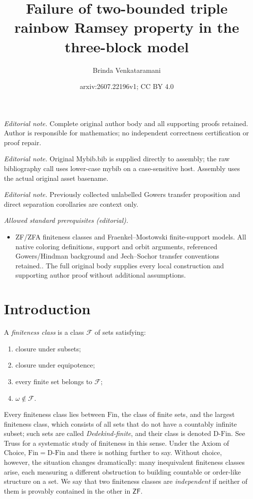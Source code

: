 \documentclass[10pt,a4paper]{amsart}
\title{Failure of two-bounded triple rainbow Ramsey property in the three-block model}
\author{Brinda Venkataramani}
\date{arxiv:2607.22196v1; CC BY 4.0}
\theoremstyle{definition}
\newcommand{\ZF}{\mathsf{ZF}}
\newcommand{\Fin}{\mathrm{Fin}}
\newcommand{\DFin}{\mathrm{D\text{-}Fin}}
\begin{document}
\maketitle
\noindent\textit{Editorial note.} Complete original author body and all supporting proofs retained. Author is responsible for mathematics; no independent correctness certification or proof repair.\par\medskip
\noindent\textit{Editorial note.} Original Mybib.bib is supplied directly to assembly; the raw bibliography call uses lower-case mybib on a case-sensitive host. Assembly uses the actual original asset basename.\par\medskip
\noindent\textit{Editorial note.} Previously collected unlabelled Gowers transfer proposition and direct separation corollaries are context only.\par\medskip
\noindent\textit{Allowed standard prerequisites (editorial).}\begin{itemize}
\item ZF/ZFA finiteness classes and Fraenkel--Mostowski finite-support models. All native coloring definitions, support and orbit arguments, referenced Gowers/Hindman background and Jech--Sochor transfer conventions retained.. The full original body supplies every local construction and supporting author proof without additional assumptions.
\end{itemize}\medskip
\section{Introduction}

A \emph{finiteness class} is a class \(\mathcal F\) of sets satisfying:
\begin{enumerate}[label=(\roman*)]
    \item closure under subsets;
    \item closure under equipotence;
    \item every finite set belongs to \(\mathcal F\);
    \item \(\omega\notin \mathcal F\).
\end{enumerate}
Every finiteness class lies between \(\Fin\), the class of finite sets, and the largest finiteness class, which consists of all sets that do not have a countably infinite subset; such sets are called \emph{Dedekind-finite}, and their class is denoted \(\DFin\).  See Truss \cite{TrussFiniteness} for a systematic study of finiteness in this sense.  Under the Axiom of Choice, \(\Fin=\DFin\) and there is nothing further to say.  Without choice, however, the situation changes dramatically: many inequivalent finiteness classes arise, each measuring a different obstruction to building countable or order-like structure on a set.  We say that two finiteness classes are \emph{independent} if neither of them is provably contained in the other in \(\ZF\).
\end{document}

